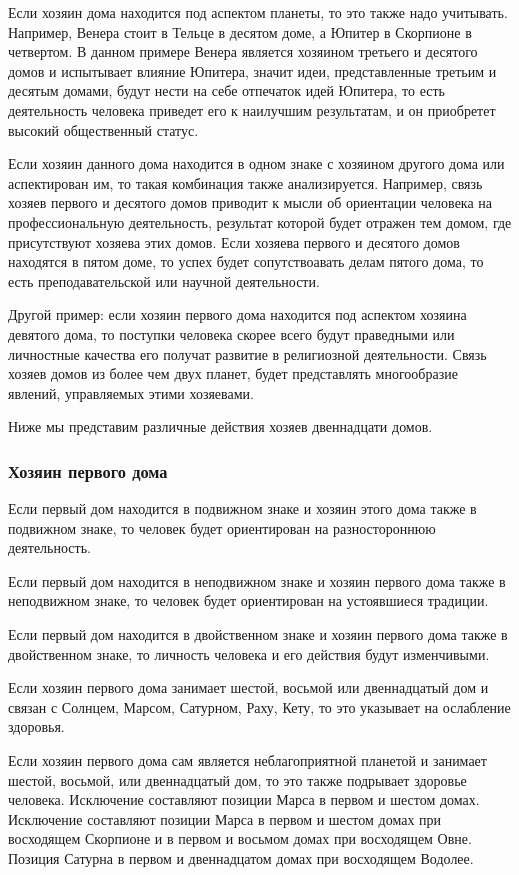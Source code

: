 Если хозяин дома находится под аспектом планеты, то это также надо учитывать. Например, Венера стоит в Тельце в десятом доме, а Юпитер в Скорпионе в четвертом. В данном примере Венера является хозяином третьего и десятого домов и испытывает влияние Юпитера, значит идеи, представленные третьим и десятым домами, будут нести на себе отпечаток идей Юпитера, то есть деятельность человека приведет его к наилучшим результатам, и он приобретет высокий общественный статус.

Если хозяин данного дома находится в одном знаке с хозяином другого дома или аспектирован им, то такая комбинация также анализируется. Например, связь хозяев первого и десятого домов приводит к мысли об ориентации человека на профессиональную деятельность, результат которой будет отражен тем домом, где присутствуют хозяева этих домов. Если хозяева первого и десятого домов находятся в пятом доме, то успех будет сопутствоавать делам пятого дома, то есть преподавательской или научной деятельности.

Другой пример: если хозяин первого дома находится под аспектом хозяина девятого дома, то поступки человека скорее всего будут праведными или личностные качества его получат развитие в религиозной деятельности. Связь хозяев домов из более чем двух планет, будет представлять многообразие явлений, управляемых этими хозяевами.

Ниже мы представим различные действия хозяев двеннадцати домов.

\subsubsection*{Хозяин первого дома}

Если первый дом находится в подвижном знаке и хозяин этого дома также в подвижном знаке, то человек будет ориентирован на разностороннюю деятельность.

Если первый дом находится в неподвижном знаке и хозяин первого дома также в неподвижном знаке, то человек будет ориентирован на устоявшиеся традиции.

Если первый дом находится в двойственном знаке и хозяин первого дома также в двойственном знаке, то личность человека и его действия будут изменчивыми.

Если хозяин первого дома занимает шестой, восьмой или двеннадцатый дом и связан с Солнцем, Марсом, Сатурном, Раху, Кету, то это указывает на ослабление здоровья.

Если хозяин первого дома сам является неблагоприятной планетой и занимает шестой, восьмой, или двеннадцатый дом, то это также подрывает здоровье человека. Исключение составляют позиции Марса в первом и шестом домах. Исключение составляют позиции Марса в первом и шестом домах при восходящем Скорпионе и в первом и восьмом домах при восходящем Овне. Позиция Сатурна в первом и двеннадцатом домах при восходящем Водолее.


